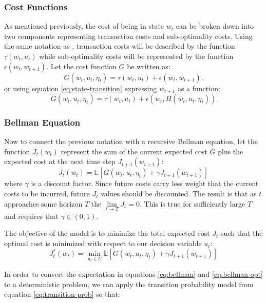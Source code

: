 \documentclass{article}
\begin{document}
\subsubsection{Cost Functions}
As mentioned previously, the cost of being in state $w_t$ can be broken down into two components representing transaction costs and sub-optimality costs. Using the same notation as \cite{b5}, transaction costs will be described by the function $\tau(w_t, u_t)$ while sub-optimality costs will be represented by the function $\epsilon(w_t, w_{t+1})$. Let the cost function $G$ be written as:
\begin{equation}
G(w_t, u_t, \eta_t) = \tau(w_t, u_t) + \epsilon(w_t, w_{t+1}). \label{eq:cost-fun1}
\end{equation}
or using equation \ref{eq:state-transition} expressing $w_{t+1}$ as a function:
\begin{equation}
G(w_t, u_t, \eta_t) = \tau(w_t, u_t) + \epsilon(w_t,  H(w_t, u_t, \eta_t)) \label{eq:cost-fun2}
\end{equation}

\subsubsection{Bellman Equation}
Now to connect the previous notation with a recursive Bellman equation, let the function $J_t(w_t)$ represent the sum of the current expected cost $G$ plus the expected cost at the next time step $J_{t+1}(w_{t+1})$:
\begin{equation}
J_t(w_t) = \mathbb{E}[G(w_t, u_t, \eta_t) + \gamma J_{t+1}(w_{t+1})] \label{eq:bellman}
\end{equation}
where $\gamma$ is a discount factor. Since future costs carry less weight that the current costs to be incurred, future $J_t$ values should be discounted. The result is that as $t$ approaches some horizon $T$ the $\lim\limits_{t \to T}{J_t = 0}$. This is true for sufficiently large $T$ and requires that $\gamma \in (0, 1)$. 

The objective of the model is to minimize the total expected cost $J_t$ such that the optimal cost is minimized with respect to our decision variable $u_t$:
\begin{equation}
J_t^*(w_t) = \min_{u_t \in U} \mathbb{E}[G(w_t, u_t, \eta_t) + \gamma J_{t+1}(w_{t+1})] \label{eq:bellman-opt}
\end{equation}

In order to convert the expectation in equations \ref{eq:bellman} and \ref{eq:bellman-opt} to a deterministic problem, we can apply the transition probability model from equation  \ref{eq:transition-prob} so that:
\end{document}
